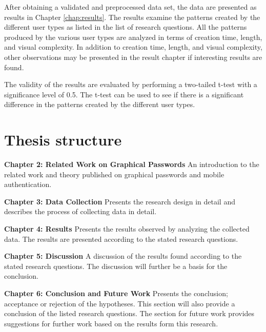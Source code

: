       After obtaining a validated and preprocessed data set, the data are presented as results in Chapter \ref{chap:results}. The results examine the patterns created by the different user types as listed in the list of research questions. All the patterns produced by the various user types are analyzed in terms of creation time, length, and visual complexity. In addition to creation time, length, and visual complexity, other observations may be presented in the result chapter if interesting results are found. 

      The validity of the results are evaluated by performing a two-tailed t-test with a significance level of 0.5. The t-test can be used to see if there is a significant difference in the patterns created by the different user types.

  \clearpage
  \section{Thesis structure} \label{sec:structure}

    {\bf Chapter 2: Related Work on Graphical Passwords}
    An introduction to the related work and theory published on graphical passwords and mobile authentication.

    {\bf Chapter 3: Data Collection}
    Presents the research design in detail and describes the process of collecting data in detail.

    {\bf Chapter 4: Results}
    Presents the results observed by analyzing the collected data. The results are presented according to the stated research questions.

    {\bf Chapter 5: Discussion}
    A discussion of the results found according to the stated research questions. The discussion will further be a basis for the conclusion. 

    {\bf Chapter 6: Conclusion and Future Work}
    Presents the conclusion; acceptance or rejection of the hypotheses. This section will also provide a conclusion of the listed research questions. The section for future work provides suggestions for further work based on the results form this research. 